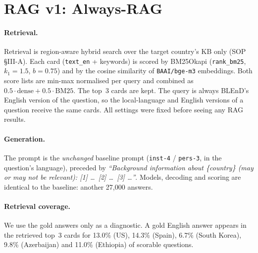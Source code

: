 \documentclass[11pt]{article}
\begin{document}
\section{RAG v1: Always-RAG}
\label{sec:ragv1}
\paragraph{Retrieval.} Retrieval is region-aware hybrid search over the target country's KB only (SOP
\S III-A). Each card (\texttt{text\_en} + keywords) is scored by BM25Okapi (\texttt{rank\_bm25},
$k_1{=}1.5$, $b{=}0.75$) and by the cosine similarity of \texttt{BAAI/bge-m3} embeddings. Both score
lists are min-max normalised per query and combined as $0.5\cdot\text{dense} + 0.5\cdot\text{BM25}$.
The top~3 cards are kept. The query is always BLEnD's English version of the question, so the
local-language and English versions of a question receive the same cards. All settings were fixed
before seeing any RAG results.

\paragraph{Generation.} The prompt is the \emph{unchanged} baseline prompt (\texttt{inst-4} /
\texttt{pers-3}, in the question's language), preceded by \emph{``Background information about
\{country\} (may or may not be relevant): [1] \ldots\ [2] \ldots\ [3] \ldots''}. Models, decoding and
scoring are identical to the baseline: another 27{,}000 answers.

\paragraph{Retrieval coverage.} We use the gold answers only as a diagnostic. A gold English answer
appears in the retrieved top~3 cards for 13.0\% (US), 14.3\% (Spain), 6.7\% (South Korea), 9.8\%
(Azerbaijan) and 11.0\% (Ethiopia) of scorable questions.
\end{document}
